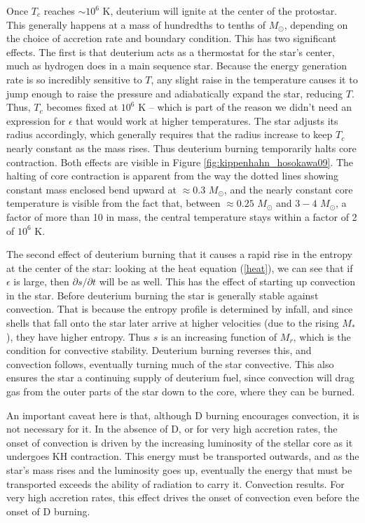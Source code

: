 Once $T_c$ reaches $\sim 10^6$ K, deuterium will ignite at the center of the protostar. This generally happens at a mass of hundredths to tenths of $M_\odot$, depending on the choice of accretion rate and boundary condition. This has two significant effects. The first is that deuterium acts as a thermostat for the star's center, much as hydrogen does in a main sequence star. Because the energy generation rate is so incredibly sensitive to $T$, any slight raise in the temperature causes it to jump enough to raise the pressure and adiabatically expand the star, reducing $T$. Thus, $T_c$ becomes fixed at $10^6$ K -- which is part of the reason we didn't need an expression for $\epsilon$ that would work at higher temperatures. The star adjusts its radius accordingly, which generally requires that the radius increase to keep $T_c$ nearly constant as the mass rises. Thus deuterium burning temporarily halts core contraction. Both effects are visible in Figure \ref{fig:kippenhahn_hosokawa09}. The halting of core contraction is apparent from the way the dotted lines showing constant mass enclosed bend upward at $\approx 0.3$ $M_\odot$, and the nearly constant core temperature is visible from the fact that, between $\approx 0.25$ $M_\odot$ and $3-4$ $M_\odot$, a factor of more than 10 in mass, the central temperature stays within a factor of 2 of $10^6$ K.

The second effect of deuterium burning that it causes a rapid rise in the entropy at the center of the star: looking at the heat equation (\ref{heat}), we can see that if $\epsilon$ is large, then $\partial s/\partial t$ will be as well. This has the effect of starting up convection in the star. Before deuterium burning the star is generally stable against convection. That is because the entropy profile is determined by infall, and since shells that fall onto the star later arrive at higher velocities (due to the rising $M_*$), they have higher entropy. Thus $s$ is an increasing function of $M_r$, which is the condition for convective stability. Deuterium burning reverses this, and convection follows, eventually turning much of the star convective. This also ensures the star a continuing supply of deuterium fuel, since convection will drag gas from the outer parts of the star down to the core, where they can be burned.

An important caveat here is that, although D burning encourages convection, it is not necessary for it. In the absence of D, or for very high accretion rates, the onset of convection is driven by the increasing luminosity of the stellar core as it undergoes KH contraction. This energy must be transported outwards, and as the star's mass rises and the luminosity goes up, eventually the energy that must be transported exceeds the ability of radiation to carry it. Convection results. For very high accretion rates, this effect drives the onset of convection even before the onset of D burning.

